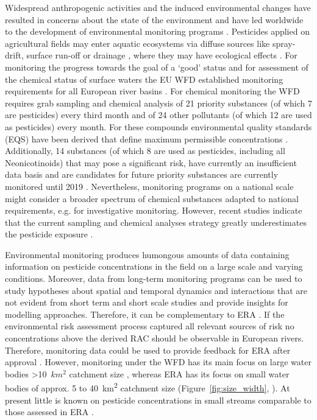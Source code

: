 Widespread anthropogenic activities and the induced environmental changes have resulted in concerns about the state of the environment and have led worldwide to the development of environmental monitoring programs \citep{nichols_monitoring_2006}. 
Pesticides applied on agricultural fields may enter aquatic ecosystems via diffuse sources like spray-drift, surface run-off or drainage \citep{schulz_field_2004, stehle_probabilistic_2013, liess_determination_1999, carter_how_2000}, where they may have ecological effects \citep{liess_analyzing_2005, schafer_effects_2007, schafer_effects_2012}.
For monitoring the progress towards the goal of a `good' status and for assessment of the chemical status of surface waters the EU WFD established monitoring requirements for all European river basins \citep{european_union_directive_2000}. 
For chemical monitoring the WFD requires grab sampling and chemical analysis of 21 priority substances (of which 7 are pesticides) every third month and of 24 other pollutants (of which 12 are used as pesticides) every month.
For these compounds environmental quality standards (EQS) have been derived that define maximum permissible concentrations \citep{european_union_directive_2013}. 
Additionally, 14 substances (of which 8 are used as pesticides, including all Neonicotinoids) that may pose a significant risk, have currently an insufficient data basis and are candidates for future priority substances are currently monitored until 2019 \citep{european_union_commission_2015}.
Nevertheless, monitoring programs on a national scale might consider a broader spectrum of chemical substances adapted to national requirements, e.g. for investigative monitoring.
However, recent studies indicate that the current sampling and chemical analyses strategy greatly underestimates the pesticide exposure \citep{stehle_probabilistic_2013, xing_influences_2013, moschet_how_2014}. 

Environmental monitoring produces humongous amounts of data containing information on pesticide concentrations in the field on a large scale and varying conditions.
Moreover, data from long-term monitoring programs can be used to study hypotheses about spatial and temporal dynamics and interactions that are not evident from short term and short scale studies \citep{gitzen_design_2012} and provide insights for modelling approaches. 
Therefore, it can be complementary to ERA \citep{suter_ecological_2007}.
If the environmental risk assessment process captured all relevant sources of risk no concentrations above the derived RAC should be observable in European rivers. 
Therefore, monitoring data could be used to provide feedback for ERA after approval \citep{knauer_pesticides_2016}. 
However, monitoring under the WFD has its main focus on large water bodies \textgreater 10~$km^2$ catchment size \citep{european_union_directive_2000}, whereas ERA has its focus on small water bodies of approx. 5 to 40~km\textsuperscript{2} catchment size (Figure~\ref{fig:size_width}, \citet{european_union_regulation_2009, brock_aquatic_2006}).
At present little is known on pesticide concentrations in small streams comparable to those assessed in ERA \citep{lorenz_specifics_2016, biggs_importance_2016}. 




